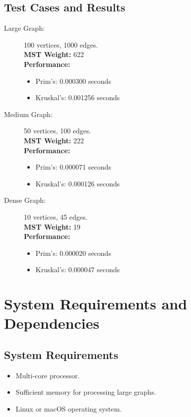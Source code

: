 \documentclass[11pt]{article}
\begin{document}
\subsection{Test Cases and Results}
\begin{description}
    \item[Large Graph:] 100 vertices, 1000 edges. \\
    \textbf{MST Weight:} 622 \\
    \textbf{Performance:}
    \begin{itemize}
        \item Prim's: 0.000300 seconds
        \item Kruskal's: 0.001256 seconds
    \end{itemize}
    
    \item[Medium Graph:] 50 vertices, 100 edges. \\
    \textbf{MST Weight:} 222 \\
    \textbf{Performance:}
    \begin{itemize}
        \item Prim's: 0.000071 seconds
        \item Kruskal's: 0.000126 seconds
    \end{itemize}
    
    \item[Dense Graph:] 10 vertices, 45 edges. \\
    \textbf{MST Weight:} 19 \\
    \textbf{Performance:}
    \begin{itemize}
        \item Prim's: 0.000020 seconds
        \item Kruskal's: 0.000047 seconds
    \end{itemize}
\end{description}

\section{System Requirements and Dependencies}
\subsection{System Requirements}
\begin{itemize}
    \item Multi-core processor.
    \item Sufficient memory for processing large graphs.
    \item Linux or macOS operating system.
\end{itemize}
\end{document}
